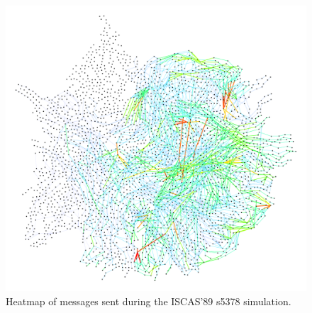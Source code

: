 \documentclass[11pt]{book}
\begin{document}
\begin{figure}
\centering
\includegraphics[width=\textwidth,height=0.9\textheight,keepaspectratio]{figs/s5378}
\caption{Heatmap of messages sent during the ISCAS'89 s5378 simulation.}
\end{figure}
\end{document}
